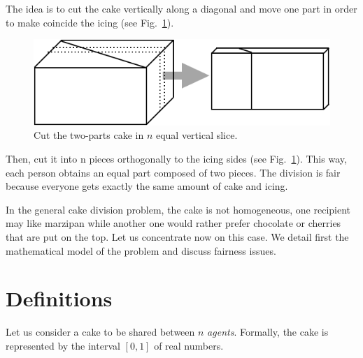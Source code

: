 \begin{itemize}
The idea is to cut the cake vertically along a diagonal and move one part in order to make coincide the icing
(see Fig.~\ref{Fig:cakeHomogeneous3}).
\begin{figure}[htb]
\begin{center}
        \includegraphics[scale=0.4]{FiguresMaths/CakeHomogeneous3}
        \caption{Cut the two-parts cake in $n$ equal vertical slice.}
        \label{Fig:cakeHomogeneous3}
\end{center}
\end{figure}
Then, cut it into n pieces orthogonally to the icing sides (see Fig.~\ref{Fig:cakeHomogeneous3}). 
This way, each person obtains an equal part composed of two pieces. 
The division is fair because everyone gets exactly the same amount of cake and icing. 
\end{itemize}

In the general cake division problem, the cake is not homogeneous, 
one recipient may like marzipan while another one would rather prefer chocolate or cherries
that are put on the top.
Let us concentrate now on this case.
We detail first the mathematical model of the problem and discuss fairness issues. 


\section{Definitions}

Let us consider a cake to be shared between $n$ \textit{agents}. 
Formally, the cake is represented by the interval $[0,1]$ of real numbers.

